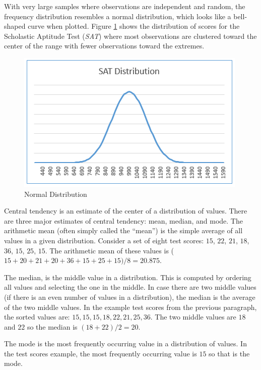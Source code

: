 With very large samples where observations are independent and random, the frequency distribution resembles a normal distribution, which looks like a bell-shaped curve when plotted. Figure \ref{14:fig02} shows the distribution of scores for the Scholastic Aptitude Test (\textit{SAT}) where most observations are clustered toward the center of the range with fewer observations toward the extremes. 

\begin{figure}[H]
	\centering
	\includegraphics[width=\maxwidth{.95\linewidth}]{gfx/14-NormDist}
	\caption{Normal Distribution}
	\label{14:fig02}
\end{figure}

Central tendency is an estimate of the center of a distribution of values. There are three major estimates of central tendency: mean, median, and mode. The arithmetic mean (often simply called the ``mean'') is the simple average of all values in a given distribution. Consider a set of eight test scores: $ 15 $, $ 22 $, $ 21 $, $ 18 $, $ 36 $, $ 15 $, $ 25 $, $ 15 $. The arithmetic mean of these values is ($ 15 + 20 + 21 + 20 + 36 + 15 + 25 + 15)/8 = 20.875 $.

The median, is the middle value in a distribution. This is computed by ordering all values and selecting the one in the middle. In case there are two middle values (if there is an even number of values in a distribution), the median is the average of the two middle values. In the example test scores from the previous paragraph, the sorted values are: $ 15 , 15 , 15 , 18 , 22 , 21, 25, 36 $. The two middle values are $ 18 $ and $ 22 $ so the median is $ (18 + 22)/2 = 20 $. 

The mode is the most frequently occurring value in a distribution of values. In the test scores example, the most frequently occurring value is $ 15 $ so that is the mode.

